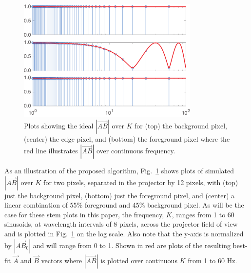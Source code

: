 \documentclass[10pt]{article}
\begin{document}
\begin{figure}[!t]
\centering\includegraphics[width=3.55in]{Figures/figure05}
\caption{Plots showing the ideal $|\vec{AB}|$ over $K$ for (top) the background pixel, (center) the edge pixel, and (bottom) the foreground pixel where the red line illustrates $|\vec{AB}|$ over continuous frequency.}
\label{fig05}
\end{figure}

As an illustration of the proposed algorithm, Fig.~\ref{fig05} shows plots of simulated $|\vec{AB}|$ over $K$ for two pixels, separated in the projector by 12 pixels, with (top) just the background pixel, (bottom) just the foreground pixel, and (center) a linear combination of 55\% foreground and 45\% background pixel.  As will be the case for these stem plots in this paper, the frequency, $K$, ranges from 1 to 60 sinusoids, at wavelength intervals of 8 pixels, across the projector field of view and is plotted in Fig.~\ref{fig05} on the log scale.  Also note that the y-axis is normalized by $|\vec{AB}_{0}|$ and will range from 0 to 1. Shown in red are plots of the resulting best-fit $\vec{A}$ and $\vec{B}$ vectors where $|\vec{AB}|$ is plotted over continuous $K$ from 1 to 60 Hz.

\end{document}
